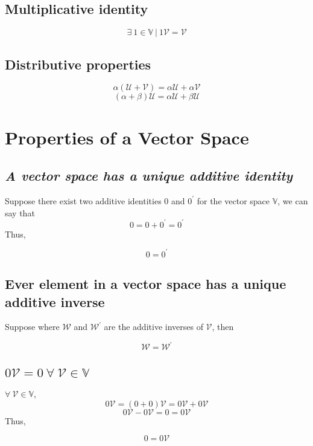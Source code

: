 \subsection{Multiplicative identity}
$$\exists \ 1 \in \mathbb{V} \ | \ 1 \mathcal{V} = \mathcal{V}$$
\subsection{Distributive properties}
$$\alpha (\mathcal{U} + \mathcal{V}) = \alpha \mathcal{U} + \alpha \mathcal{V}$$
$$(\alpha + \beta) \mathcal{U} = \alpha \mathcal{U} + \beta \mathcal{U}$$
\section{Properties of a Vector Space}
\subsection{\textit{A vector space has a unique additive identity}}
Suppose there exist two additive identities $0$ and $0^{'}$ for the vector space $\mathbb{V}$, we can say that
$$0 = 0 +  0^{'} = 0^{'}$$
Thus,
\begin{tcolorbox}
	\begin{equation}
		0 = 0^{'}
	\end{equation}
\end{tcolorbox}
\subsection{Ever element in a vector space has a unique additive inverse}
Suppose where $\mathcal{W}$ and $\mathcal{W}^{'}$ are the additive inverses of $\mathcal{V}$, then

\begin{tcolorbox}
\begin{equation}
\mathcal{W} = \mathcal{W}^{'}
\end{equation}
\end{tcolorbox}
 
\subsection{$0\mathcal{V} = 0 \  \forall \ \mathcal{V} \in \mathbb{V}$}
$\forall \ \mathcal{V} \in \mathbb{V}$,
$$0 \mathcal{V} = (0 + 0) \mathcal{V} = 0 \mathcal{V} + 0 \mathcal{V}$$
$$0 \mathcal{V} - 0 \mathcal{V} = 0 = 0 \mathcal{V} $$
Thus,
\begin{tcolorbox}
	\begin{equation}
		 0 = 0 \mathcal{V}
	\end{equation}
 \end{tcolorbox}
